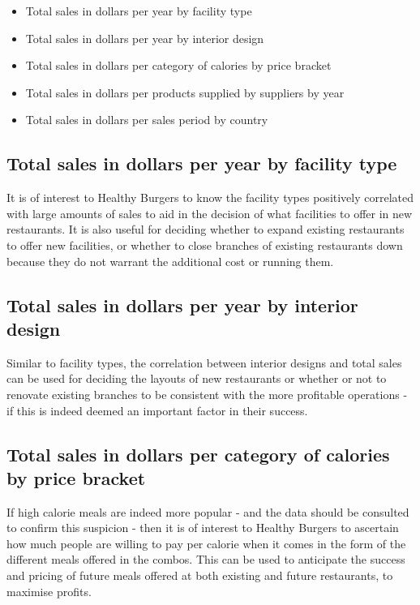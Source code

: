 \documentclass[12pt, a4paper]{article}
\begin{document}
\begin{itemize}
	\item Total sales in dollars per year by facility type
	\item Total sales in dollars per year by interior design
	\item Total sales in dollars per category of calories by price bracket
	\item Total sales in dollars per products supplied by suppliers by year
	\item Total sales in dollars per sales period by country
\end{itemize}

\subsection*{Total sales in dollars per year by facility type}

It is of interest to Healthy Burgers to know the facility types positively correlated with large amounts of sales to aid in the decision of what facilities to offer in new restaurants. It is also useful for deciding whether to expand existing restaurants to offer new facilities, or whether to close branches of existing restaurants down because they do not warrant the additional cost or running them.

\subsection*{Total sales in dollars per year by interior design}

Similar to facility types, the correlation between interior designs and total sales can be used for deciding the layouts of new restaurants or whether or not to renovate existing branches to be consistent with the more profitable operations - if this is indeed deemed an important factor in their success.

\subsection*{Total sales in dollars per category of calories by price bracket}

If high calorie meals are indeed more popular - and the data should be consulted to confirm this suspicion - then it is of interest to Healthy Burgers to ascertain how much people are willing to pay per calorie when it comes in the form of the different meals offered in the combos. This can be used to anticipate the success and pricing of future meals offered at both existing and future restaurants, to maximise profits.
\end{document}
